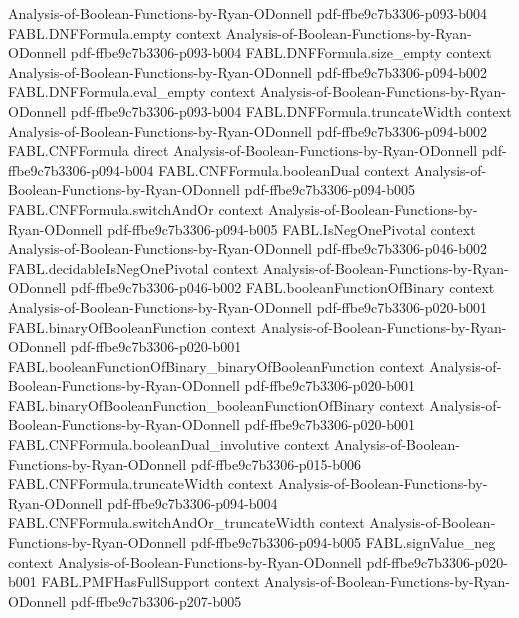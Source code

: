 \begin{theorem}
  {Analysis-of-Boolean-Functions-by-Ryan-ODonnell}
  {pdf-ffbe9c7b3306-p093-b004}
\proofstep
  {FABL.DNFFormula.empty}
  {context}
  {Analysis-of-Boolean-Functions-by-Ryan-ODonnell}
  {pdf-ffbe9c7b3306-p093-b004}
\proofstep
  {FABL.DNFFormula.size_empty}
  {context}
  {Analysis-of-Boolean-Functions-by-Ryan-ODonnell}
  {pdf-ffbe9c7b3306-p094-b002}
\proofstep
  {FABL.DNFFormula.eval_empty}
  {context}
  {Analysis-of-Boolean-Functions-by-Ryan-ODonnell}
  {pdf-ffbe9c7b3306-p093-b004}
\proofstep
  {FABL.DNFFormula.truncateWidth}
  {context}
  {Analysis-of-Boolean-Functions-by-Ryan-ODonnell}
  {pdf-ffbe9c7b3306-p094-b002}
\proofstep
  {FABL.CNFFormula}
  {direct}
  {Analysis-of-Boolean-Functions-by-Ryan-ODonnell}
  {pdf-ffbe9c7b3306-p094-b004}
\proofstep
  {FABL.CNFFormula.booleanDual}
  {context}
  {Analysis-of-Boolean-Functions-by-Ryan-ODonnell}
  {pdf-ffbe9c7b3306-p094-b005}
\proofstep
  {FABL.CNFFormula.switchAndOr}
  {context}
  {Analysis-of-Boolean-Functions-by-Ryan-ODonnell}
  {pdf-ffbe9c7b3306-p094-b005}
\proofstep
  {FABL.IsNegOnePivotal}
  {context}
  {Analysis-of-Boolean-Functions-by-Ryan-ODonnell}
  {pdf-ffbe9c7b3306-p046-b002}
\proofstep
  {FABL.decidableIsNegOnePivotal}
  {context}
  {Analysis-of-Boolean-Functions-by-Ryan-ODonnell}
  {pdf-ffbe9c7b3306-p046-b002}
\proofstep
  {FABL.booleanFunctionOfBinary}
  {context}
  {Analysis-of-Boolean-Functions-by-Ryan-ODonnell}
  {pdf-ffbe9c7b3306-p020-b001}
\proofstep
  {FABL.binaryOfBooleanFunction}
  {context}
  {Analysis-of-Boolean-Functions-by-Ryan-ODonnell}
  {pdf-ffbe9c7b3306-p020-b001}
\proofstep
  {FABL.booleanFunctionOfBinary_binaryOfBooleanFunction}
  {context}
  {Analysis-of-Boolean-Functions-by-Ryan-ODonnell}
  {pdf-ffbe9c7b3306-p020-b001}
\proofstep
  {FABL.binaryOfBooleanFunction_booleanFunctionOfBinary}
  {context}
  {Analysis-of-Boolean-Functions-by-Ryan-ODonnell}
  {pdf-ffbe9c7b3306-p020-b001}
\proofstep
  {FABL.CNFFormula.booleanDual_involutive}
  {context}
  {Analysis-of-Boolean-Functions-by-Ryan-ODonnell}
  {pdf-ffbe9c7b3306-p015-b006}
\proofstep
  {FABL.CNFFormula.truncateWidth}
  {context}
  {Analysis-of-Boolean-Functions-by-Ryan-ODonnell}
  {pdf-ffbe9c7b3306-p094-b004}
\proofstep
  {FABL.CNFFormula.switchAndOr_truncateWidth}
  {context}
  {Analysis-of-Boolean-Functions-by-Ryan-ODonnell}
  {pdf-ffbe9c7b3306-p094-b005}
\proofstep
  {FABL.signValue_neg}
  {context}
  {Analysis-of-Boolean-Functions-by-Ryan-ODonnell}
  {pdf-ffbe9c7b3306-p020-b001}
\proofstep
  {FABL.PMFHasFullSupport}
  {context}
  {Analysis-of-Boolean-Functions-by-Ryan-ODonnell}
  {pdf-ffbe9c7b3306-p207-b005}
\proofstep

\end{theorem}
